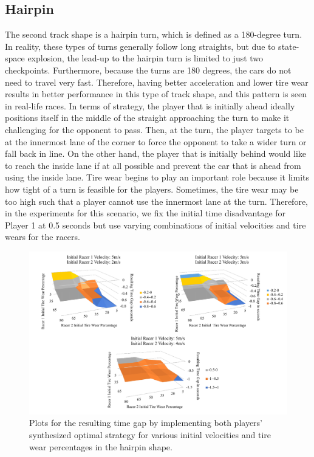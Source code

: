 \FloatBarrier
\subsection{Hairpin}
 The second track shape is a hairpin turn, which is defined as a 180-degree turn. In reality, these types of turns generally follow long straights, but due to state-space explosion, the lead-up to the hairpin turn is limited to just two checkpoints. Furthermore, because the turns are 180 degrees, the cars do not need to travel very fast. Therefore, having better acceleration and lower tire wear results in better performance in this type of track shape, and this pattern is seen in real-life races. In terms of strategy, the player that is initially ahead ideally positions itself in the middle of the straight approaching the turn to make it challenging for the opponent to pass. Then, at the turn, the player targets to be at the innermost lane of the corner to force the opponent to take a wider turn or fall back in line. On the other hand, the player that is initially behind would like to reach the inside lane if at all possible and prevent the car that is ahead from using the inside lane. Tire wear begins to play an important role because it limits how tight of a turn is feasible for the players. Sometimes, the tire wear may be too high such that a player cannot use the innermost lane at the turn. Therefore, in the experiments for this scenario, we fix the initial time disadvantage for Player 1 at 0.5 seconds but use varying combinations of initial velocities and tire wears for the racers. 

\begin{figure}
\includegraphics[width=\textwidth]{Figures/HairpinExpNew.pdf} 
    \caption[Results of scenarios in hairpin case study.] {Plots for the resulting time gap by implementing both players' synthesized optimal strategy for various initial velocities and tire wear percentages in the hairpin shape.}
    \label{fig:hp_exp}
\end{figure}


